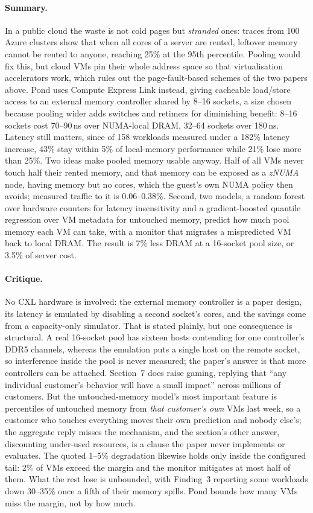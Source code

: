 \paragraph{Summary.}
In a public cloud the waste is not cold pages but \emph{stranded} ones: traces from 100
Azure clusters show that when all cores of a server are rented, leftover memory cannot
be rented to anyone, reaching 25\% at the 95th percentile. Pooling would fix this, but
cloud VMs pin their whole address space so that virtualisation accelerators work, which
rules out the page-fault-based schemes of the two papers above. Pond uses Compute
Express Link instead, giving cacheable load/store access to an external memory
controller shared by 8--16 sockets, a size chosen because pooling wider adds switches
and retimers for diminishing benefit: 8--16 sockets cost 70--90\,ns over
NUMA-local DRAM, 32--64 sockets over 180\,ns. Latency still matters, since of 158
workloads measured under a 182\% latency increase, 43\% stay within 5\% of local-memory
performance while 21\% lose more than 25\%. Two ideas make pooled memory usable anyway.
Half of all VMs never touch half their rented memory, and that memory can be exposed as
a \emph{zNUMA} node, having memory but no cores, which the guest's own NUMA policy then
avoids; measured traffic to it is 0.06--0.38\%. Second, two models, a random forest over
hardware counters for latency insensitivity and a gradient-boosted quantile regression
over VM metadata for untouched memory, predict how much pool memory each VM can take,
with a monitor that migrates a mispredicted VM back to local DRAM. The result is 7\%
less DRAM at a 16-socket pool size, or 3.5\% of server cost.

\paragraph{Critique.}
No CXL hardware is involved: the external memory controller is a paper design, its
latency is emulated by disabling a second socket's cores, and the savings come from a
capacity-only simulator. That is stated plainly, but one consequence is structural. A
real 16-socket pool has sixteen hosts contending for one controller's DDR5 channels,
whereas the emulation puts a single host on the remote socket, so interference inside the
pool is never measured; the paper's answer is that more controllers can be attached.
Section~7 does raise gaming, replying that ``any individual customer's behavior will have
a small impact'' across millions of customers. But the untouched-memory model's most
important feature is percentiles of untouched memory from \emph{that customer's own} VMs
last week, so a customer who touches everything moves their own prediction and nobody
else's; the aggregate reply misses the mechanism, and the section's other answer,
discounting under-used resources, is a clause the paper never implements or evaluates.
The quoted 1--5\% degradation likewise holds only inside the configured tail: 2\% of VMs
exceed the margin and the monitor mitigates at most half of them. What the rest lose is
unbounded, with Finding~3 reporting some workloads down 30--35\% once a fifth of their
memory spills. Pond bounds how many VMs miss the margin, not by how much.
